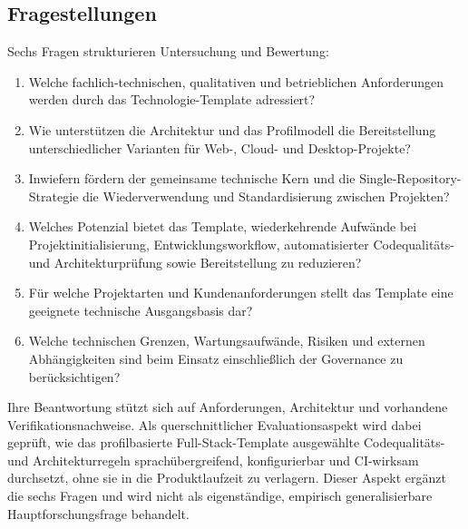 \subsection{Fragestellungen}
\label{subsec:fragestellungen}

Sechs Fragen strukturieren Untersuchung und Bewertung:

\begin{enumerate}
  \item Welche fachlich-technischen, qualitativen und betrieblichen
    Anforderungen werden durch das Technologie-Template adressiert?
  \item Wie unterstützen die Architektur und das Profilmodell die
    Bereitstellung unterschiedlicher Varianten für Web-, Cloud- und
    Desktop-Projekte?
  \item Inwiefern fördern der gemeinsame technische Kern und die
    Single-Repository-Strategie die Wiederverwendung und Standardisierung
    zwischen Projekten?
  \item Welches Potenzial bietet das Template, wiederkehrende Aufwände bei
    Projektinitialisierung, Entwicklungsworkflow, automatisierter Codequalitäts-
    und Architekturprüfung sowie Bereitstellung zu reduzieren?
  \item Für welche Projektarten und Kundenanforderungen stellt das Template
    eine geeignete technische Ausgangsbasis dar?
  \item Welche technischen Grenzen, Wartungsaufwände, Risiken und externen
    Abhängigkeiten sind beim Einsatz einschließlich der Governance zu
    berücksichtigen?
\end{enumerate}

Ihre Beantwortung stützt sich auf Anforderungen, Architektur und vorhandene
Verifikationsnachweise. Als querschnittlicher Evaluationsaspekt wird dabei
geprüft, wie das profilbasierte Full-Stack-Template ausgewählte Codequalitäts-
und Architekturregeln sprachübergreifend, konfigurierbar und CI-wirksam
durchsetzt, ohne sie in die Produktlaufzeit zu verlagern. Dieser Aspekt ergänzt
die sechs Fragen und wird nicht als eigenständige, empirisch generalisierbare
Hauptforschungsfrage behandelt.
